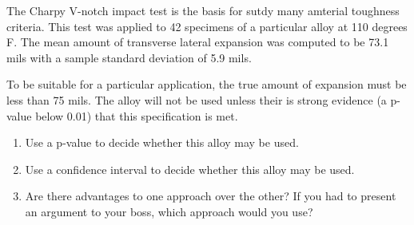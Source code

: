 \documentclass[twoside]{book}\usepackage[]{graphicx}\usepackage[]{xcolor}
\begin{document}
\begin{problem}
	The Charpy V-notch impact test is the basis for sutdy many amterial toughness criteria.
	This test was applied to 42 specimens of a particular alloy at 110 degrees F.
	The mean amount of transverse lateral expansion was computed to be
	73.1 mils with a sample standard deviation of 5.9 mils.

	To be suitable for a particular application, the true amount of expansion must be less than 75 mils.
	The alloy will not be used unless their is strong evidence (a p-value below 0.01) that 
	this specification is met.

	\begin{enumerate}
		\item
			Use a p-value to decide whether this alloy may be used.
		\item
			Use a confidence interval to decide whether this alloy may be used.
		\item
			Are there advantages to one approach over the other?  If you had to present
			an argument to your boss, which approach would you use?
	\end{enumerate}
\end{problem}
\end{document}
